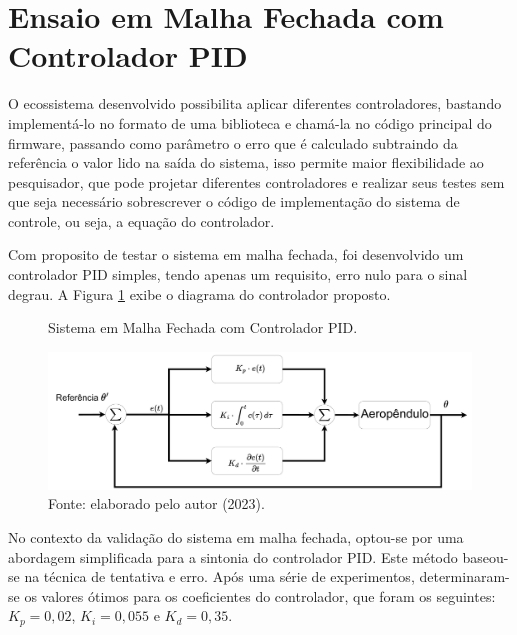 \section{Ensaio em Malha Fechada com Controlador PID}
\label{malha_fechada}

O ecossistema desenvolvido possibilita aplicar diferentes controladores, bastando implementá-lo no formato de uma biblioteca e chamá-la no código principal do firmware, passando como parâmetro o erro que é calculado subtraindo da referência o valor lido na saída do sistema, isso permite maior flexibilidade ao pesquisador, que pode projetar diferentes controladores e realizar seus testes sem que seja necessário sobrescrever o código de implementação do sistema de controle, ou seja, a equação do controlador.

Com  proposito de testar o sistema em malha fechada, foi desenvolvido um controlador PID simples, tendo apenas um requisito, erro nulo para o sinal degrau. A Figura \ref{fig3:image_23} exibe o diagrama do controlador proposto.%


\begin{figure}[!h]
	\centering
	\caption{Sistema em Malha Fechada com Controlador PID.}
	\includegraphics[width=1\textwidth]{Capitulos/3_1_resultados_discurcao/3_figuras/estrutura_pid.pdf}
	\caption*{Fonte: elaborado pelo autor (2023).}
	\label{fig3:image_23}
\end{figure}


No contexto da validação do sistema em malha fechada, optou-se por uma abordagem simplificada para a sintonia do controlador PID. Este método baseou-se na técnica de tentativa e erro. Após uma série de experimentos, determinaram-se os valores ótimos para os coeficientes do controlador, que foram os seguintes: $K_p=0,02$, $K_i=0,055$ e $K_d=0,35$.



